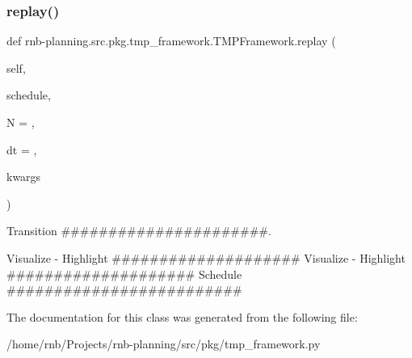 \subsubsection{\texorpdfstring{replay()}{replay()}}
{\footnotesize\ttfamily def rnb-\/planning.\+src.\+pkg.\+tmp\+\_\+framework.\+T\+M\+P\+Framework.\+replay (\begin{DoxyParamCaption}\item[{}]{self,  }\item[{}]{schedule,  }\item[{}]{N = {},  }\item[{}]{dt = {},  }\item[{}]{kwargs }\end{DoxyParamCaption})}



Transition \#\#\#\#\#\#\#\#\#\#\#\#\#\#\#\#\#\#\#\#\#\#. 

Visualize -\/ Highlight \#\#\#\#\#\#\#\#\#\#\#\#\#\#\#\#\#\#\#\# Visualize -\/ Highlight \#\#\#\#\#\#\#\#\#\#\#\#\#\#\#\#\#\#\#\# Schedule \#\#\#\#\#\#\#\#\#\#\#\#\#\#\#\#\#\#\#\#\#\#\#\#\# 

The documentation for this class was generated from the following file\+:\begin{DoxyCompactItemize}
\item 
/home/rnb/\+Projects/rnb-\/planning/src/pkg/tmp\+\_\+framework.\+py\end{DoxyCompactItemize}
